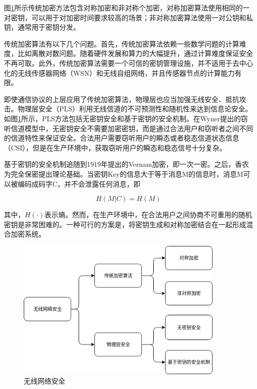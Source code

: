 \documentclass[master]{seuthesis} %
\begin{document}
\begin{Main}
图\ref{wirelss-network-security}所示传统加密方法包含对称加密和非对称个加密，对称加密算法使用相同的一对密钥，可以用于对加密时间要求较高的场景；非对称加密算法使用一对公钥和私钥，通常用于密钥分发。

传统加密算法有以下几个问题。首先，传统加密算法依赖一些数学问题的计算难度，比如离散对数问题。随着硬件发展和算力的大幅提升，通过计算难度保证安全不再可取。此外，传统加密算法需要一个可信的密钥管理设施，并不适用于去中心化的无线传感器网络（WSN）和无线自组网络，并且传感器节点的计算能力有限。

即使通信协议的上层应用了传统加密算法，物理层也应当加强无线安全、抵抗攻击。物理层安全（PLS）利用无线信道的不可预测性和随机性来达到信息论安全。如图\ref{wirelss-network-security}所示，PLS方法包括无密钥安全和基于密钥的安全机制。在Wyner提出的窃听信道模型中，无密钥安全不需要加密密钥，而是通过合法用户和窃听者之间不同的信道特性来保证安全\cite{6739367}。合法用户需要窃听用户的瞬态或者稳态信道状态信息（CSI），但是在生产环境中，获取窃听用户的瞬态和稳态信号十分复杂。

基于密钥的安全机制追随到1919年提出的Vernam加密，即一次一密\cite{vernam1922secret}。之后，香农为完全保密提出理论基础\cite{shannon1949communication}。当密钥Key的信息大于等于消息M的信息时，消息M可以被编码成码字C，并不会泄露任何消息，即

\begin{equation}
    H(M|C) = H(M)
\end{equation}

其中，$H(\cdot)$表示熵。然而，在生产环境中，在合法用户之间协商不可重用的随机密钥是非常困难的。一种可行的方案是，将密钥生成和对称加密结合在一起形成混合加密系统。

\begin{figure}[htbp!]
    \centering \includegraphics[width=0.9\textwidth]{images/wireless-network-security} 
    \caption{无线网络安全}
    \label{wirelss-network-security}
\end{figure}


\end{Main}
\end{document}
